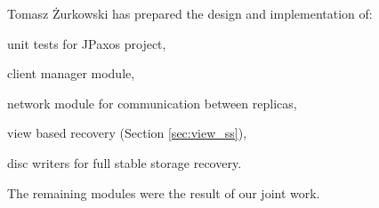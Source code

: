 \noindent Tomasz Żurkowski has prepared the design and implementation of:
\begin{tightList}
  \item[\textbullet] unit tests for JPaxos project,
  \item[\textbullet] client manager module, 
  \item[\textbullet] network module for communication between replicas,
  \item[\textbullet] view based recovery (Section \ref{sec:view_ss}),
  \item[\textbullet] disc writers for full stable storage recovery.
\end{tightList}

\noindent The remaining modules were the result of our joint work.
